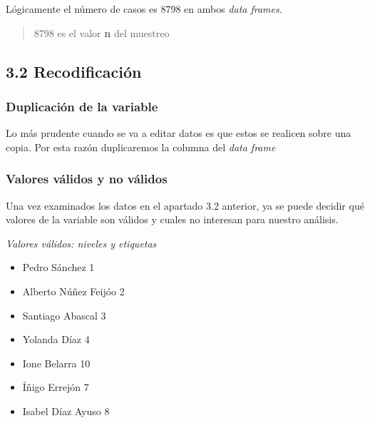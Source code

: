 \documentclass[
  12 pt,
  a4paper,
]{article}
\newenvironment{Shaded}{\begin{snugshade}}{\end{snugshade}}
\newcommand{\NormalTok}[1]{#1}
\newcommand{\OtherTok}[1]{\textcolor[rgb]{0.56,0.35,0.01}{#1}}
\newcommand{\SpecialCharTok}[1]{\textcolor[rgb]{0.81,0.36,0.00}{\textbf{#1}}}
\providecommand{\tightlist}{%
  \setlength{\itemsep}{0pt}\setlength{\parskip}{0pt}}
\begin{document}
Lógicamente el número de casos es 8798 en ambos \emph{data frames}.

\begin{quote}
8798 es el valor \textbf{n} del muestreo
\end{quote}

\hypertarget{recodificaciuxf3n}{%
\subsection{3.2 Recodificación}\label{recodificaciuxf3n}}

\hypertarget{duplicaciuxf3n-de-la-variable}{%
\subsubsection{Duplicación de la
variable}\label{duplicaciuxf3n-de-la-variable}}

Lo más prudente cuando se va a editar datos es que estos se realicen
sobre una copia. Por esta razón duplicaremos la columna del \emph{data
frame}

\begin{Shaded}
\end{Shaded}

\hypertarget{valores-vuxe1lidos-y-no-vuxe1lidos}{%
\subsubsection{Valores válidos y no
válidos}\label{valores-vuxe1lidos-y-no-vuxe1lidos}}

Una vez examinados los datos en el apartado 3.2 anterior, ya se puede
decidir qué valores de la variable son válidos y cuales no interesan
para nuestro análisis.

\emph{Valores válidos: niveles y etiquetas}

\begin{itemize}
\tightlist
\item
  Pedro Sánchez 1
\item
  Alberto Núñez Feijóo 2
\item
  Santiago Abascal 3
\item
  Yolanda Díaz 4
\item
  Ione Belarra 10
\item
  Íñigo Errejón 7
\item
  Isabel Díaz Ayuso 8
\end{itemize}
\end{document}

